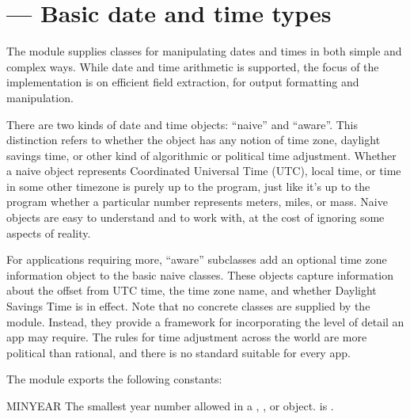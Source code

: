 
\section{ ---
         Basic date and time types}




The  module supplies classes for manipulating dates
and times in both simple and complex ways.  While date and time
arithmetic is supported, the focus of the implementation is on
efficient field extraction, for output formatting and manipulation.

There are two kinds of date and time objects: ``naive'' and ``aware''.
This distinction refers to whether the object has any notion of time
zone, daylight savings time, or other kind of algorithmic or political
time adjustment.  Whether a {naive}  object represents
Coordinated Universal Time (UTC), local time, or time in some other
timezone is purely up to the program, just like it's up to the program
whether a particular number represents meters, miles, or mass.  Naive
 objects are easy to understand and to work with, at
the cost of ignoring some aspects of reality.

For applications requiring more, ``aware''  subclasses add an
optional time zone information object to the basic naive classes.
These  objects capture information about the offset from
UTC time, the time zone name, and whether Daylight Savings Time is in
effect.  Note that no concrete  classes are supplied by
the  module.  Instead, they provide a framework for
incorporating the level of detail an app may require.  The rules for
time adjustment across the world are more political than rational, and
there is no standard suitable for every app.

The  module exports the following constants:

\begin{datadesc}{MINYEAR}
  The smallest year number allowed in a ,
  , or  object.  
  is .
\end{datadesc}

